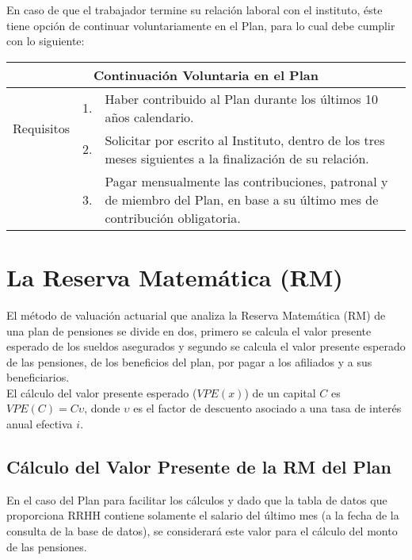 \documentclass[12pt,letterpaper,titlepage]{article}
\begin{document}
{En caso de que el trabajador termine su relación laboral con el instituto, éste tiene opción de continuar voluntariamente en el Plan, para lo cual debe cumplir con lo siguiente:

\begin{center}
	\begin{tabular}{|c||c||p{10cm}|}
		\hline 
		\multicolumn{3}{|c|}{Continuación Voluntaria en el Plan} \\ 
		\hline 
		\hline 
		\multirow{2}{24mm}[-20mm]{Requisitos}& 1. & Haber contribuido al Plan durante los últimos 10 años calendario. \\ 
		\cline{2-3}
		& 2. & Solicitar por escrito al Instituto, dentro de los tres meses siguientes a la finalización de su relación. \\ 
		\cline{2-3}
		& 3. & Pagar mensualmente las contribuciones, patronal y de miembro del Plan, en base a su último mes de contribución obligatoria. \\ 
		\hline 
	\end{tabular} 
\end{center}


\newpage

\section{La Reserva Matemática (RM)}

El método de valuación actuarial que analiza la Reserva Matemática (RM) de una plan de pensiones se divide en dos, primero se calcula el valor presente esperado de los sueldos asegurados y segundo se calcula el valor presente esperado de las pensiones, de los beneficios del plan, por pagar a los afiliados y a sus beneficiarios.\\

El cálculo del valor presente esperado ($V\!PE(x)$) de un capital $C$ es $V\!PE(C)=C\upsilon$, donde $\upsilon$ es el factor de descuento asociado a una tasa de interés anual efectiva $i$. 


\subsection{Cálculo del Valor Presente de la RM del Plan}

En el caso del Plan para facilitar los cálculos y dado que la tabla de datos que proporciona RRHH contiene solamente el salario del último mes (a la fecha de la consulta de la base de datos), se considerará este valor para el cálculo del monto de las pensiones.\\

}
\end{document}
